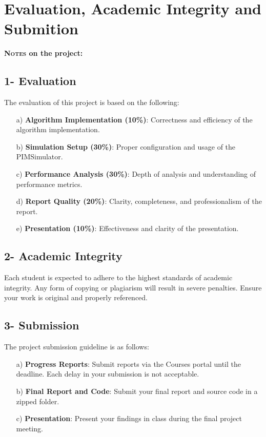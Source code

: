 \documentclass[12pt]{article}
\begin{document}
\thispagestyle{empty}

\setcounter{page}{0}

\newpage
\section*{Evaluation, Academic Integrity and Submition}
\textbf{\textsc{Notes} on the project:}
\subsection*{1- Evaluation}
The evaluation of this project is based on the following:

\begin{enumerate}
	\item[a)] \textbf{Algorithm Implementation (10\%)}: Correctness and efficiency of the algorithm implementation.
	\item[b)] \textbf{Simulation Setup (30\%)}: Proper configuration and usage of the PIMSimulator.
	\item[c)] \textbf{Performance Analysis (30\%)}: Depth of analysis and understanding of performance metrics.
	\item[d)] \textbf{Report Quality (20\%)}: Clarity, completeness, and professionalism of the report.
	\item[e)] \textbf{Presentation (10\%)}: Effectiveness and clarity of the presentation.
\end{enumerate}

\subsection*{2- Academic Integrity}
Each student is expected to adhere to the highest standards of academic integrity. Any form of copying or plagiarism will result in severe penalties. Ensure your work is original and properly referenced.

\subsection*{3- Submission}
The project submission guideline is as follows:

\begin{enumerate}
	\item[a)] \textbf{Progress Reports}: Submit reports via the Courses portal until the deadline. Each delay in your submission is not acceptable.
	\item[b)] \textbf{Final Report and Code}: Submit your final report and source code in a zipped folder.
	\item[c)] \textbf{Presentation}: Present your findings in class during the final project meeting.
\end{enumerate}
\newpage
\end{document}
